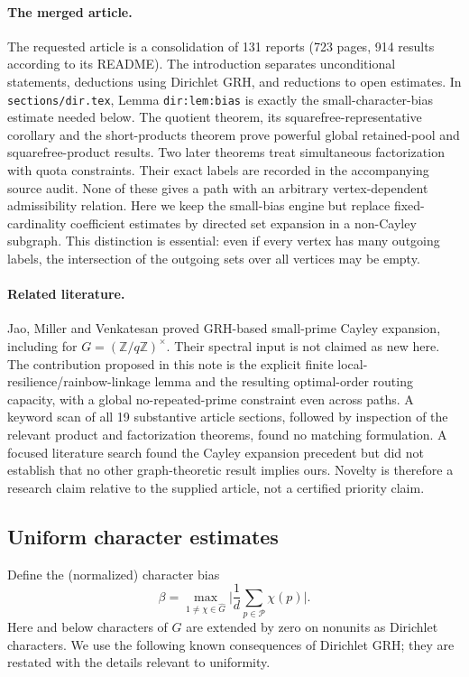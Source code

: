 \documentclass[11pt]{article}
\theoremstyle{remark}\newtheorem{remark}[theorem]{Remark}
\newcommand{\Pp}{\mathcal P}
\newcommand{\abs}[1]{\lvert#1\rvert}
\newcommand{\Z}{\mathbb Z}
\begin{document}
\paragraph{The merged article.} The requested article \cite{article} is a consolidation of 131 reports (723 pages, 914 results according to its README). The introduction separates unconditional statements, deductions using Dirichlet GRH, and reductions to open estimates. In \texttt{sections/dir.tex}, Lemma \texttt{dir:lem:bias} is exactly the small-character-bias estimate needed below. The quotient theorem, its squarefree-representative corollary and the short-products theorem prove powerful global retained-pool and squarefree-product results. Two later theorems treat simultaneous factorization with quota constraints. Their exact labels are recorded in the accompanying source audit. None of these gives a path with an arbitrary vertex-dependent admissibility relation. Here we keep the small-bias engine but replace fixed-cardinality coefficient estimates by directed set expansion in a non-Cayley subgraph. This distinction is essential: even if every vertex has many outgoing labels, the intersection of the outgoing sets over all vertices may be empty.

\paragraph{Related literature.} Jao, Miller and Venkatesan \cite{jmv} proved GRH-based small-prime Cayley expansion, including for $G=(\Z/q\Z)^\times$. Their spectral input is not claimed as new here. The contribution proposed in this note is the explicit finite local-resilience/rainbow-linkage lemma and the resulting optimal-order routing capacity, with a global no-repeated-prime constraint even across paths. A keyword scan of all 19 substantive article sections, followed by inspection of the relevant product and factorization theorems, found no matching formulation. A focused literature search found the Cayley expansion precedent but did not establish that no other graph-theoretic result implies ours. Novelty is therefore a research claim relative to the supplied article, not a certified priority claim.

\subsection{Uniform character estimates}
Define the (normalized) character bias
\[
 \beta=\max_{1\ne\chi\in\widehat G}\abs{\frac1d\sum_{p\in\Pp}\chi(p)}.
\]
Here and below characters of $G$ are extended by zero on nonunits as Dirichlet characters. We use the following known consequences of Dirichlet GRH; they are restated with the details relevant to uniformity.
\end{document}
